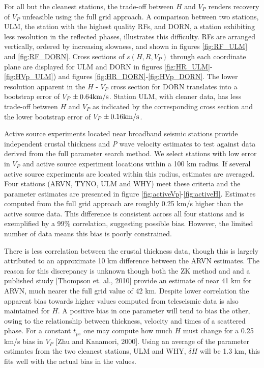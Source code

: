 \documentclass[draft, 12pt]{article}
\begin{document}
For all but the cleanest stations, the trade-off between $H$ and $V_P$ renders recovery of $V_P$ unfeasible using the full grid approach. A comparison between two stations, ULM, the station with the highest quality RFs, and DORN, a station exhibiting less resolution in the reflected phases, illustrates this difficulty. RFs are arranged vertically, ordered by increasing slowness, and shown in figures \ref{fig:RF_ULM} and \ref{fig:RF_DORN}. Cross sections of $s(H,R,V_P)$ through each coordinate plane are displayed for ULM and DORN in figures \ref{fig:HR_ULM}-\ref{fig:HVp_ULM}) and figures \ref{fig:HR_DORN}-\ref{fig:HVp_DORN}. The lower resolution apparent in the $H$ - $V_P$ cross section for DORN translates into a bootstrap error of $V_P \pm 0.64 {\rm km/s}$. Station ULM, with cleaner data, has less trade-off between $H$ and $V_P$ as indicated by the corresponding cross section and the lower bootstrap error of $V_P \pm 0.16 {\rm km/s}$.

Active source experiments located near broadband seismic stations provide independent crustal thickness and {\it P} wave velocity estimates to test against data derived from the full parameter search method. We select stations with low error in $V_P$ and active source experiment locations within a 100 km radius. If several active source experiments are located within this radius, estimates are averaged. Four stations (ARVN, TYNO, ULM and WHY) meet these criteria and the parameter estimates are presented in figure \ref{fig:activeVp}-\ref{fig:activeH}. Estimates computed from the full grid approach are roughly 0.25 km/s higher than the active source data. This difference is consistent across all four stations and is exemplified by a 99\% correlation, suggesting possible bias. However, the limited number of data means this bias is poorly constrained.

There is less correlation between the crustal thickness data, though this is largely attributed to an approximate 10 km difference between the ARVN estimates. The reason for this discrepancy is unknown though both the ZK method and and a published study [Thompson et. al., 2010] provide an estimate of near 41 km for ARVN, much nearer the full grid value of 42 km. Despite lower correlation the apparent bias towards higher values computed from teleseismic data is also maintained for $H$. A positive bias in one parameter will tend to bias the other, owing to the relationship between thickness, velocity and times of a scattered phase. For a constant $t_{ps}$ one may compute how much $H$ must change for a 0.25 km/s bias in $V_P$ [Zhu and Kanamori, 2000]. Using an average of the parameter estimates from the two cleanest stations, ULM and WHY, $\delta H$ will be 1.3 km, this fits well with the actual bias in the values.
\end{document}
